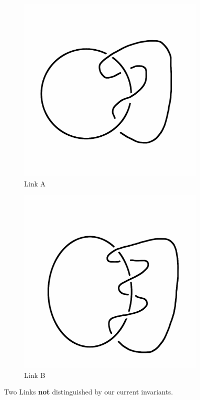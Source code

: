 \documentclass[12pt,letterpaper]{article}
\theoremstyle{definition}
\begin{document}
\begin{figure}[h]
    \centering
    \begin{subfigure}{.3\textwidth}
        \centering
        \includegraphics[width=\textwidth]{knotpics/lno2.png}
        \caption{Link A}
    \end{subfigure}
    \hspace{1cm}
    \begin{subfigure}{.3\textwidth}
        \centering         
        \includegraphics[width=\textwidth]{knotpics/lno3.png}
        \caption{Link B}
    \end{subfigure}
    \caption{Two Links \textbf{not} distinguished by our current invariants.}
\end{figure}
\end{document}
